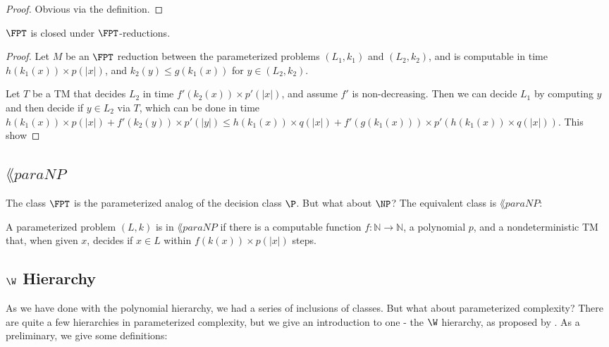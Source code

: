 \begin{proof}
Obvious via the definition.
\end{proof}

\begin{theorem}
$\FPT$ is closed under $\FPT$-reductions.
\end{theorem}

\begin{proof}
Let $M$ be an $\FPT$ reduction between the parameterized problems $(L_1, k_1)$ and $(L_2, k_2)$, and is computable in time $h(k_1(x)) \times p(|x|)$, and $k_2(y) \le g(k_1(x))$ for $y \in (L_2, k_2)$. 

\par Let $T$ be a TM that decides $L_2$ in time $f'(k_2(x)) \times p'(|x|)$, and assume $f'$ is non-decreasing. Then we can decide $L_1$ by computing $y$ and then decide if $y \in L_2$ via $T$, which can be done in time $h(k_1(x)) \times p(|x|) + f'(k_2(y)) \times p'(|y|) \le h(k_1(x)) \times q(|x|) + f'(g(k_1(x))) \times p'(h(k_1(x)) \times q(|x|))$. This show
\end{proof}

\newcommand{\paraNP}{\lang{paraNP}}
\subsection{$\paraNP$}
The class $\FPT$ is the parameterized analog of the decision class $\P$. But what about $\NP$? The equivalent class is $\paraNP$:
\begin{definition}
A parameterized problem $(L, k)$ is in $\paraNP$ if there is a computable function $f: \mathbb{N} \rightarrow \mathbb{N}$, a polynomial $p$, and a nondeterministic TM that, when given $x$, decides if $x \in L$ within $f(k(x)) \times p(|x|)$ steps.
\end{definition}


\subsection{$\W$ Hierarchy}
As we have done with the polynomial hierarchy, we had a series of inclusions of classes. But what about parameterized complexity? There are quite a few hierarchies in parameterized complexity, but we give an introduction to one - the $\W$ hierarchy, as proposed by \cite{Downey1995109}. As a preliminary, we give some definitions:

